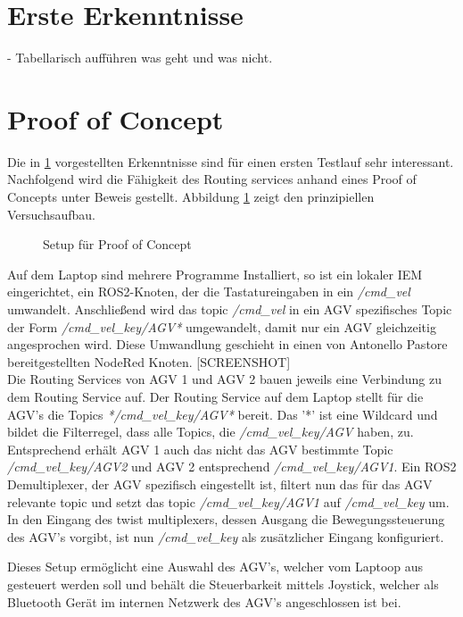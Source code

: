 		
	\section{Erste Erkenntnisse}
	\label{VoruntersuchungenNetzwerke:Erkenntnisse}
		- Tabellarisch aufführen was geht und was nicht.
	
	\section{Proof of Concept}
	\label{VoruntersuchungenNetzwerke:ProofofConcept}
		Die in \ref{VoruntersuchungenNetzwerke:Erkenntnisse} vorgestellten Erkenntnisse sind für einen ersten Testlauf sehr interessant. Nachfolgend wird die Fähigkeit des Routing services anhand eines Proof of Concepts unter Beweis gestellt.
		Abbildung \ref{fig:VoruntersuchungenNetzwerke:ProofofConcept:Struktur} zeigt den prinzipiellen Versuchsaufbau.
		\begin{figure}[H]
			\centering
			
			\caption{Setup für Proof of Concept}
			\label{fig:VoruntersuchungenNetzwerke:ProofofConcept:Struktur}					
		\end{figure}
		
		
		Auf dem Laptop sind mehrere Programme Installiert, so ist ein lokaler IEM eingerichtet, ein ROS2-Knoten, der die Tastatureingaben in ein \textit{/cmd\_vel} umwandelt.
		Anschließend wird das topic \textit{/cmd\_vel} in ein AGV spezifisches Topic der Form \textit{/cmd\_vel\_key/AGV*} umgewandelt, damit nur ein AGV gleichzeitig angesprochen wird.
		Diese Umwandlung geschieht in einen von Antonello Pastore bereitgestellten NodeRed Knoten.
		[SCREENSHOT]\\
		Die Routing Services von AGV 1 und AGV 2 bauen jeweils eine Verbindung zu dem Routing Service auf.
		Der Routing Service auf dem Laptop stellt für die AGV's die Topics \textit{*/cmd\_vel\_key/AGV*} bereit.
		Das '*' ist eine Wildcard und bildet die Filterregel, dass alle Topics, die \textit{/cmd\_vel\_key/AGV} haben, zu.
		Entsprechend erhält AGV 1 auch das nicht das AGV bestimmte Topic \textit{/cmd\_vel\_key/AGV2} und AGV 2 entsprechend \textit{/cmd\_vel\_key/AGV1}.
		Ein ROS2 Demultiplexer, der AGV spezifisch eingestellt ist, filtert nun das für das AGV relevante topic und setzt das topic \textit{/cmd\_vel\_key/AGV1} auf \textit{/cmd\_vel\_key} um.
		In den Eingang des twist multiplexers, dessen Ausgang die Bewegungssteuerung des AGV's vorgibt, ist nun \textit{/cmd\_vel\_key} als zusätzlicher Eingang konfiguriert.
		
		Dieses Setup ermöglicht eine Auswahl des AGV's, welcher vom Laptoop aus gesteuert werden soll und behält die Steuerbarkeit mittels Joystick, welcher als Bluetooth Gerät im internen Netzwerk des AGV's angeschlossen ist bei.

		
	
		
		
	